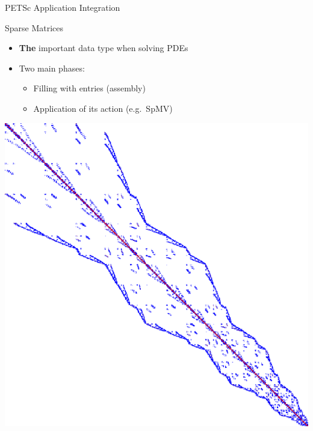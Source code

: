 
\begin{frame}[fragile]{PETSc Application Integration}

\begin{block}{Sparse Matrices}
\begin{itemize}
  \item \textbf{The} important data type when solving PDEs
  \item Two main phases: 
    \begin{itemize}
     \item Filling with entries (assembly)
     \item Application of its action (e.g.~SpMV)
    \end{itemize}
\end{itemize}
\end{block}
\begin{center}
\includegraphics[width=.5\textwidth]{figures/EllipRCMSquare}
\end{center}
\end{frame}



